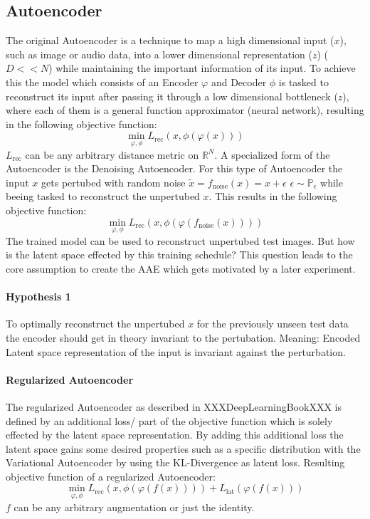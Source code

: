\documentclass[10pt,a4paper]{article}
\begin{document}
\subsection{Autoencoder}\label{Autoencoder}
The original Autoencoder is a technique to map a high dimensional input ($x$), such as image or audio data, into a lower dimensional representation ($z$) ($D << N$) while maintaining the important information of its input. To achieve this the model which consists of an Encoder $\varphi$ and Decoder $\phi$ is tasked to reconstruct its input after passing it through a low dimensional bottleneck ($z$), where each of them is a general function approximator (neural network), resulting in the following objective function:
\begin{equation}
\min_{\varphi, \phi} L_{\text{rec}}(x, \phi(\varphi(x)))
\end{equation}
$L_{\text{rec}}$ can be any arbitrary distance metric on $\mathbb{R}^N$. 
A specialized form of the Autoencoder is the  Denoising Autoencoder. For this type of Autoencoder the input $x$ gets pertubed with random noise $\tilde{x} = f_{\text{noise}}(x) =x + \epsilon$ $\epsilon \sim \mathbb{P}_{\epsilon}$ while beeing tasked to reconstruct the unpertubed $x$. This results in the following objective function:
\begin{equation}
\min_{\varphi, \phi} L_{\text{rec}}(x, \phi(\varphi(f_{\text{noise}}(x) )))
\end{equation}
The trained model can be used to reconstruct unpertubed test images. But how is the latent space effected by this training schedule?
This question leads to the core assumption to create the AAE which gets motivated by a later experiment.
\paragraph{Hypothesis 1} To optimally reconstruct the unpertubed $x$ for the previously unseen test data the encoder should get in theory invariant to the pertubation. Meaning: Encoded Latent space representation of the input is invariant against the perturbation.\\
\paragraph{Regularized Autoencoder}
The regularized Autoencoder as described in XXXDeepLearningBookXXX is defined by an additional loss/ part of the objective function which is solely effected by the latent space representation. By adding this additional loss the latent space gains some desired properties such as a specific distribution with the Variational Autoencoder by using the KL-Divergence as latent loss.
Resulting objective function of a regularized Autoencoder:
\begin{equation}
\min_{\varphi, \phi} L_{\text{rec}}(x, \phi(\varphi(f(x) ))) + L_{\text{lat}}(\varphi(f(x)))
\end{equation}
$f$ can be any arbitrary augmentation or just the identity.
\end{document}
